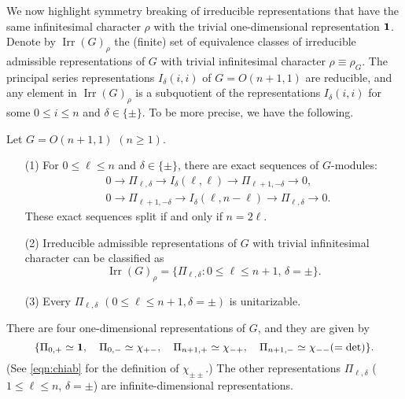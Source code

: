 \bigskip
We now highlight symmetry breaking
 of irreducible representations
 that have the same infinitesimal character $\rho$
 with the trivial one-dimensional representation ${\bf{1}}$.  
Denote by 
${\operatorname{Irr}}(G)_{\rho}$
 the (finite) set
 of equivalence classes 
 of irreducible admissible representations
 of $G$
 with trivial infinitesimal character $\rho\equiv \rho_G$.  
The principal series representations $I_\delta(i,i)$ of $G=O(n+1,1)$
 are reducible, 
 and any element in ${\operatorname{Irr}}(G)_{\rho}$
 is a subquotient
 of the representations $I_\delta(i,i)$
 for some $0 \le i \le n$
 and $\delta \in \{\pm\}$.  
To be more precise,
 we have the following.  
\begin{theorem}
Let $G=O(n+1,1)$ $(n \ge 1)$.  
\begin{enumerate}
\item[{\rm{(1)}}]
For $0 \le \ell \le n$ and $\delta \in \{ \pm \}$, 
 there are exact sequences of $G$-modules:
\begin{align*}
&0 \to \Pi_{\ell,\delta} \to I_{\delta}(\ell,\ell) \to \Pi_{\ell+1,-\delta}
\to 0, 
\\
&0 \to \Pi_{\ell+1,-\delta} \to I_{\delta}(\ell,n-\ell) \to \Pi_{\ell,\delta} \to 0.  
\end{align*}
These exact sequences split
 if and only if $n=2\ell$.  


\item[{\rm{(2)}}]
Irreducible admissible representations of $G$ 
 with trivial infinitesimal character 
 can be classified as
\[
  {\operatorname{Irr}}(G)_{\rho}
  =\{
    \Pi_{\ell, \delta}
    :
    0 \le \ell \le n+1, \, \delta = \pm
\}.  
\]

\item[{\rm{(3)}}]
Every $\Pi_{\ell,\delta}$ $(0 \le \ell \le n+1, \delta = \pm)$
 is unitarizable.  
\end{enumerate}
\end{theorem}

\medskip
There are four one-dimensional representations of $G$, 
 and they are given by 
\begin{equation*}
\{
  \Pi_{0,+} \simeq {\bf{1}}, \quad \Pi_{0,-} \simeq \chi_{+-}, 
\quad
   \Pi_{n+1,+} \simeq \chi_{-+}, \quad 
   \Pi_{n+1,-} \simeq \chi_{--} (=\det)
\}.  
\end{equation*}
(See \eqref{eqn:chiab} for the definition of
 $\chi_{\pm\pm}$.)
The other representations $\Pi_{\ell,\delta}$
 ($1 \le \ell \le n$, $\delta=\pm$)
 are infinite-dimensional representations.  



